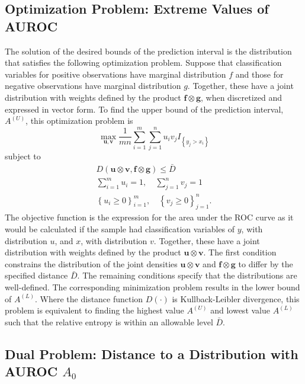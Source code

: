 \subsection{Optimization Problem: Extreme Values of AUROC}

The solution of the desired bounds of the prediction interval is the distribution that satisfies the following optimization problem.
Suppose that classification variables for positive observations have marginal distribution $f$ and those for negative observations have marginal distribution $g$.
Together, these have a joint distribution with weights defined by the product $\mathbf{f} \otimes \mathbf{g}$, when discretized and expressed in vector form.
%
To find the upper bound of the prediction interval, $A^{(U)}$, this optimization problem is
%
\begin{equation}
    \max_{\mathbf{u}, \mathbf{v}} \frac{1}{m n} \sum_{i = 1}^{m} \sum_{j = 1}^{n} u_i v_j I_{\left\{ y_j > x_i \right\}}
\end{equation}
%
\noindent subject to
\begin{align}
    D(\mathbf{u} \otimes \mathbf{v}, \mathbf{f} \otimes \mathbf{g}) \leq \bar{D} \\
    \sum_{i = 1}^{m} u_i = 1, \quad \sum_{j = 1}^{n} v_j = 1 \\
    \left\{ u_i  \geq 0 \right\}_{i=1}^{m}, \quad \left\{ v_j \geq 0 \right\}_{j=1}^{n}.
\end{align}
%
\noindent The objective function is the expression for the area under the ROC curve as it would be calculated if the sample had classification variables of $y$, with distribution $u$, and $x$, with distribution $v$.
Together, these have a joint distribution with weights defined by the product $\mathbf{u} \otimes \mathbf{v}$.
The first condition constrains the distribution of the joint densities $\mathbf{u} \otimes \mathbf{v}$ and $\mathbf{f} \otimes \mathbf{g}$ to differ by the specified distance $\bar{D}$.
%
The remaining conditions specify that the distributions are well-defined.
%
The corresponding minimization problem results in the lower bound of $A^{(L)}$. 
% 
Where the distance function $D(\cdot)$ is Kullback-Leibler divergence, this problem is equivalent to finding the highest value $A^{(U)}$ and lowest value $A^{(L)}$ such that the relative entropy is within an allowable level $\bar{D}$. 


\subsection{Dual Problem: Distance to a Distribution with AUROC $A_0$}

